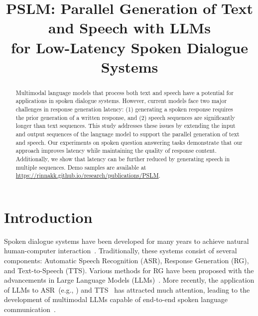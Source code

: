 \title{PSLM: Parallel Generation of Text and Speech with LLMs\\for Low-Latency Spoken Dialogue Systems}



\renewcommand{\arraystretch}{0.8}
\setlength{\abovedisplayskip}{5pt}
\setlength{\belowdisplayskip}{5pt}

\maketitle
\begin{abstract}
Multimodal language models that process both text and speech have a potential for applications in spoken dialogue systems.
However, current models face two major challenges in response generation latency: 
(1) generating a spoken response requires the prior generation of a written response, and
(2) speech sequences are significantly longer than text sequences.
This study addresses these issues by extending the input and output sequences of the language model to support the parallel generation of text and speech.
Our experiments on spoken question answering tasks demonstrate that our approach improves latency while maintaining the quality of response content.
Additionally, we show that latency can be further reduced by generating speech in multiple sequences.
Demo samples are available at \url{https://rinnakk.github.io/research/publications/PSLM}.
\end{abstract}

\section{Introduction}

Spoken dialogue systems have been developed for many years to achieve natural human-computer interaction~\citep{mctear2002spoken,jokinen2009spoken,hongshen2017survey}.
Traditionally, these systems consist of several components: Automatic Speech Recognition (ASR), Response Generation (RG), and Text-to-Speech (TTS).
Various methods for RG have been proposed with the advancements in Large Language Models (LLMs)~\citep{wang2023survey,yi2024survey}.
More recently, the application of LLMs to ASR~(e.g., \citealt{wang2023viola,hono-etal-2024-integrating,fathullah2024prompting}) and TTS~\citep{wang2023viola,hao2023boosting} has attracted much attention, leading to the development of multimodal LLMs capable of end-to-end spoken language communication~\citep{zhang-etal-2023-speechgpt,nachmani2024spoken}.

